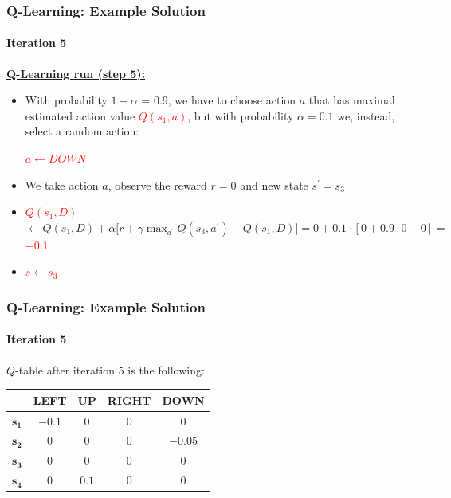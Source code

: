 \begin{frame}[<+->]
	\frametitle{Q-Learning: Example Solution}
	\framesubtitle{Iteration 5}
	
	\vspace{0.5cm}
	
	\textbf{\underline{Q-Learning run (step 5):}}
	
	\begin{itemize}
		\item With probability $ 1 - \alpha $ = 0.9, we have to choose action $ a $ that
			  has maximal estimated action value \textcolor{red}{$ Q(s_1,a) $}, but with
			  probability $ \alpha = 0.1 $ we, instead, select a random action:
			  
			  \begin{center}
				  \textcolor{red}{$ a \leftarrow DOWN $}
			  \end{center}
		\item We take action $ a $, observe the reward $ r = 0 $ and new state $
			  s^\prime = s_3 $
		\item \textcolor{red}{$ Q(s_1,D) $} $ \leftarrow Q(s_1,D) + \alpha \Big [ r + \gamma \max_{a^\prime} Q(s_3,a^\prime) - Q(s_1,D) \Big ] = 0 + 0.1 \cdot [ 0 + 0.9 \cdot 0 - 0 ] = $ \textcolor{red}{$ -0.1 $}
		\item \textcolor{red}{$ s \leftarrow s_3 $}
	\end{itemize}
\end{frame}

\begin{frame}
	\frametitle{Q-Learning: Example Solution}
	\framesubtitle{Iteration 5}
	
	\Large
	
	$ Q $-table after iteration 5 is the following:
	
	\begin{table}[!h]
		\begin{tabular}{c|c|c|c|c|}
			\cline{2-5}
			& \textbf{LEFT} & \textbf{UP} & \textbf{RIGHT} & \textbf{DOWN} \\ \hline
			\multicolumn{1}{|c|}{$ \mathbf{s_1} $} & $ -0.1 $ & $ 0 $ & $ 0 $ & $ 0 $\\ \hline
			\multicolumn{1}{|c|}{$ \mathbf{s_2} $} & $ 0 $ & $ 0 $ & $ 0 $ & $ -0.05 $\\ \hline
			\multicolumn{1}{|c|}{$ \mathbf{s_3} $} & $ 0 $ & $ 0 $ & $ 0 $ & $ 0 $\\ \hline
			\multicolumn{1}{|c|}{$ \mathbf{s_4} $} & $ 0 $ & $ 0.1 $ & $ 0 $ & $ 0 $\\ \hline
		\end{tabular}
	\end{table}
\end{frame}

